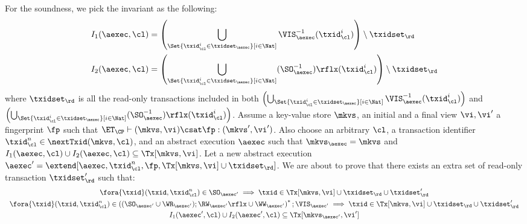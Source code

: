 For the soundness, we pick the invariant as the following:
\begin{align*}
    I_1(\aexec, \cl) & = \left( \bigcup_{\Set{\txid_{\cl}^{i} \in \txidset_{\aexec} }[ i \in \Nat ]} \VIS_{\aexec}^{-1}(\txid^i_\cl) \right) \setminus \txidset_\rd \\
    I_2(\aexec, \cl) & = \left( \bigcup_{\Set{\txid_{\cl}^{i} \in \txidset_{\aexec} }[ i \in \Nat ]} (\SO_{\aexec}^{-1})\rflx(\txid^i_\cl) \right) \setminus \txidset_\rd
\end{align*}
where \( \txidset_\rd \) is all the read-only transactions included in both 
\( \left( \bigcup_{\Set{\txid_{\cl}^{i} \in \txidset_{\aexec} }[ i \in \Nat ]} \VIS_{\aexec}^{-1}(\txid^i_\cl) \right)\) 
and \( \left( \bigcup_{\Set{\txid_{\cl}^{i} \in \txidset_{\aexec} }[ i \in \Nat ]} (\SO_{\aexec}^{-1})\rflx(\txid^i_\cl) \right) \).
Assume a key-value store $\mkvs$, an initial and a final view $\vi, \vi'$  a fingerprint $\fp$ 
such that $\ET_{\CP} \vdash (\mkvs, \vi) \csat \fp: ( \mkvs',\vi')$. 
Also choose an arbitrary $\cl$, a transaction identifier $\txid_\cl^n \in \nextTxid(\mkvs, \cl)$, 
and an abstract execution $\aexec$ such that $\mkvs_{\aexec} = \mkvs$ and 
\( I_1(\aexec, \cl) \cup I_2(\aexec, \cl) \subseteq \Tx[\mkvs, \vi] \).
Let a new abstract execution \( \aexec' = \extend[\aexec, \txid_\cl^n, \fp, \Tx[\mkvs, \vi] \cup \txidset_\rd] \).
We are about to prove that there exists an extra set of read-only transaction \( \txidset'_\rd \) such that:
\begin{gather}
    \fora{\txid} (\txid, \txid_\cl^n) \in \SO_{\aexec'} \implies \txid \in \Tx[\mkvs, \vi] \cup \txidset_\rd \cup \txidset'_\rd \label{equ:cp-sound-update-so}\\
    \begin{array}{l}
    \fora{\txid} (\txid, \txid_\cl^n) \in \left( (\SO_{\aexec'} \cup \WR_{\aexec'} ) ; \RW_{\aexec'}\rflx \cup \WW_{\aexec'} \right)^* ; \VIS_{\aexec'} 
    \implies \txid \in \Tx[\mkvs, \vi] \cup \txidset_\rd \cup \txidset'_\rd 
    \end{array}
    \label{equ:cp-sound-update-arvis}\\
    I_1(\aexec',\cl) \cup I_2(\aexec',\cl) \subseteq \Tx[\mkvs_{\aexec'}, \vi'] \label{equ:cp-sound-inv} 
\end{gather}
